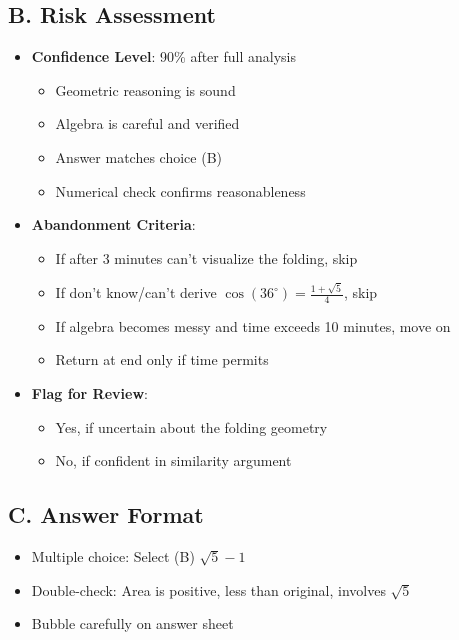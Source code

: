 \documentclass[12pt]{article}
\begin{document}
\begin{competitionbox}
\subsection*{B. Risk Assessment}
\begin{itemize}[leftmargin=*]
    \item \textbf{Confidence Level}: 90\% after full analysis
    \begin{itemize}
        \item Geometric reasoning is sound
        \item Algebra is careful and verified
        \item Answer matches choice (B)
        \item Numerical check confirms reasonableness
    \end{itemize}
    \item \textbf{Abandonment Criteria}: 
    \begin{itemize}
        \item If after 3 minutes can't visualize the folding, skip
        \item If don't know/can't derive $\cos(36^\circ) = \frac{1+\sqrt{5}}{4}$, skip
        \item If algebra becomes messy and time exceeds 10 minutes, move on
        \item Return at end only if time permits
    \end{itemize}
    \item \textbf{Flag for Review}: 
    \begin{itemize}
        \item Yes, if uncertain about the folding geometry
        \item No, if confident in similarity argument
    \end{itemize}
\end{itemize}

\subsection*{C. Answer Format}
\begin{itemize}[leftmargin=*]
    \item Multiple choice: Select (B) $\sqrt{5}-1$
    \item Double-check: Area is positive, less than original, involves $\sqrt{5}$ \checkmark
    \item Bubble carefully on answer sheet
\end{itemize}
\end{competitionbox}
\end{document}

